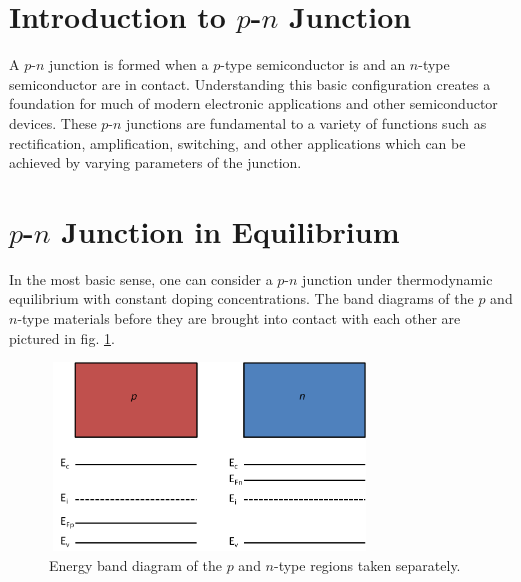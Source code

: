 \section{Introduction to $p$-$n$ Junction}\label{sec:sec001}
A $p$-$n$ junction is formed when a $p$-type semiconductor is and an $n$-type semiconductor are in contact.
Understanding this basic configuration creates a foundation for much of modern electronic
applications and other semiconductor devices. These $p$-$n$ junctions are fundamental to a variety of functions
such as rectification, amplification, switching, and other applications which can be achieved by varying parameters 
of the junction. 

\section{$p$-$n$ Junction in Equilibrium}\label{sec:sec002}
In the most basic sense, one can consider a $p$-$n$ junction under thermodynamic equilibrium with 
constant doping concentrations. The band diagrams of the $p$ and $n$-type materials before they are brought
into contact with each other are pictured in  fig. \ref{fig:fig01}. 

\begin{figure}[h!]\label{fig:fig01}
    \centering
    \includegraphics[height=5cm,width=8.5cm]{figs/unbiased_pn_junction_bands}
    \caption{Energy band diagram of the $p$ and $n$-type regions taken separately.}
\end{figure}

